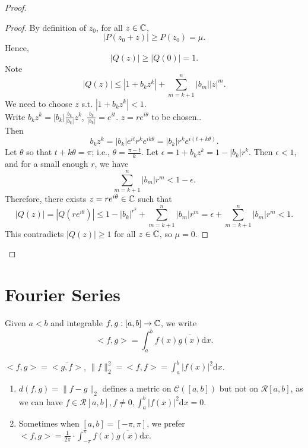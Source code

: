 \begin{proof}
\begin{proof}
		By definition of $z_{0}$, for all $z \in \mathbb{C}$,
		\[
			\left|P(z_{0}+z)\right|\ge P(z_{0})=\mu
			.\]
		Hence, \[
			\left|Q(z)\right|\ge \left|Q(0)\right|=1
			.\]
		Note
		\[
			\left|Q(z)\right|\le \left|1+b_k z^{k}\right|+ \sum_{m=k+1}^{n}{\left|b_m\right| \left|z\right|^{m}}
			.\]
		We need to choose $z$ s.t. $\left|1+b_kz^{k}\right|<1$.\\
		Write $b_{k}z^{k}=\left|b_k\right| \frac{b_k}{\left|b_k\right|}z^{k}$, $\frac{b_k}{\left|b_k\right|}=e^{it}$. $z=re^{i\theta}$ to be chosen..\\
		Then
		\[
			b_k z^{k}=\left|b_k\right|e^{it}r^{k}e^{ik \theta}=\left|b_k\right|r^{k} e^{i(t+k \theta)}
			.\]
		Let $\theta$ so that $t+k\theta=\pi$; i.e., $\theta=\frac{\pi-t}{k}$.
		Let $\epsilon=1+b_k z^{k}=1- \left|b_k\right|r^{k}$.
		Then $\epsilon<1$, and for a small enough $r$, we have
		\[
			\sum_{m=k+1}^{n}{\left|b_m\right|r^{m}}<1-\epsilon
			.\]
		Therefore, there exists $z =re^{i \theta}\in \mathbb{C}$ such that
		\[
			\left|Q(z)\right|=\left|Q(re^{i\theta})\right|\le 1-\left|b_k\right|^{r^{k}}+ \sum_{m=k+1}^{n}{\left|b_m\right|r^{m}}=\epsilon+ \sum_{m=k+1}^{n}{\left|b_m\right|r^{m}}<1
			.\]
		This contradicts $\left|Q(z)\right|\ge 1$ for all $z \in \mathbb{C}$, so $\mu=0$.
	\end{proof}
\end{proof}
\section{Fourier Series}
\begin{define}
	Given $a<b$ and integrable $f,g: [a,b]\to \mathbb{C}$, we write \[
		<f,g> = \int_{a}^{b}{f(x)\overline{g(x)}\mathrm{d}x}
		.\]
	\begin{remark}
		$<f,g>=\overline{<g,f>}$, $\|f\|_2^{2}= < f,f> = \int_{a}^{b}{\left|f(x)\right|^2\mathrm{d}x}$.
	\end{remark}
	\begin{note}
		\begin{enumerate}
			\item $d(f,g)= \|f-g\|_2$ defines a metric on $\mathscr{C}([a,b])$ but not on $\mathscr{R}[a,b]$, as we can have $f \in \mathscr{R}[a,b], f\neq 0, \int_{a}^{b}{\left|f(x)\right|^2\mathrm{d}x}=0$.
			\item Sometimes when $[a,b]= [-\pi,\pi]$, we prefer $<f ,g > = \frac{1}{2\pi} \cdot \int_{-\pi}^{\pi}{f(x) \overline{g(x)}\mathrm{d}x}$.
		\end{enumerate}
	\end{note}
\end{define}

